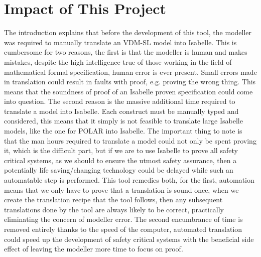 \section{Impact of This Project}
The introduction explains that before the development of this tool, the modeller was required to manually translate an VDM-SL model into Isabelle. This is cumbersome for two reasons, the first is that the modeller is human and makes mistakes, despite the high intelligence true of those working in the field of mathematical formal specification, human error is ever present. Small errors made in translation could result in faults with proof, e.g. proving the wrong thing. This means that the soundness of proof of an Isabelle proven specification could come into question. The second reason is the massive additional time required to translate a model into Isabelle. Each construct must be manually typed and considered, this means that it simply is not feasible to translate large Isabelle models, like the one for POLAR into Isabelle. The important thing to note is that the man hours required to translate a model could not only be spent proving it, which is the difficult part, but if we are to use Isabelle to prove all safety critical systems, as we should to ensure the utmost safety assurance, then a potentially life saving/changing technology could be delayed while such an automatable step is performed. This tool remedies both, for the first, automation means that we only have to prove that a translation is sound once, when we create the translation recipe that the tool follows, then any subsequent translations done by the tool are always likely to be correct, practically eliminating the concern of modeller error. The second encumbrance of time is removed entirely thanks to the speed of the computer, automated translation could speed up the development of safety critical systems with the beneficial side effect of leaving the modeller more time to focus on proof.
